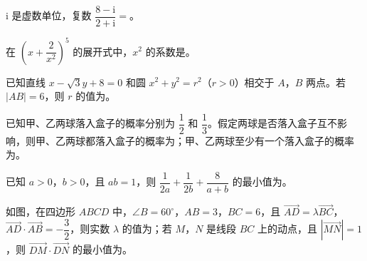 \begin{question}
$\mathrm i$ 是虚数单位，复数 $\dfrac{8-\mathrm i}{2+\mathrm i}=$\gkblank{}。

\end{question}
\begin{question}
在 $\left(x+\dfrac{2}{x^2}\right)^5$ 的展开式中，$x^2$ 的系数是\gkblank{}。

\end{question}
\begin{question}
已知直线 $x-\sqrt3y+8=0$ 和圆 $x^2+y^2=r^2$（$r>0$）相交于 $A$，$B$ 两点。若 $|AB|=6$，则 $r$ 的值为\gkblank{}。

\end{question}
\begin{question}
已知甲、乙两球落入盒子的概率分别为 $\dfrac12$ 和 $\dfrac13$。假定两球是否落入盒子互不影响，则甲、乙两球都落入盒子的概率为\gkblank{}；甲、乙两球至少有一个落入盒子的概率为\gkblank{}。

\end{question}
\begin{question}
已知 $a>0$，$b>0$，且 $ab=1$，则 $\dfrac{1}{2a}+\dfrac{1}{2b}+\dfrac{8}{a+b}$ 的最小值为\gkblank{}。

\Needspace{0.4\textheight}
\end{question}
\begin{question}
如图，在四边形 $ABCD$ 中，$\angle B=60^\circ$，$AB=3$，$BC=6$，且 $\overrightarrow{AD}=\lambda\overrightarrow{BC}$，$\overrightarrow{AD}\cdot\overrightarrow{AB}=-\dfrac32$，则实数 $\lambda$ 的值为\gkblank{}；若 $M$，$N$ 是线段 $BC$ 上的动点，且 $\left|\overrightarrow{MN}\right|=1$，则 $\overrightarrow{DM}\cdot\overrightarrow{DN}$ 的最小值为\gkblank{}。
\nopagebreak[4]
\begin{center}\end{center}
\nopagebreak[4]
\end{question}

